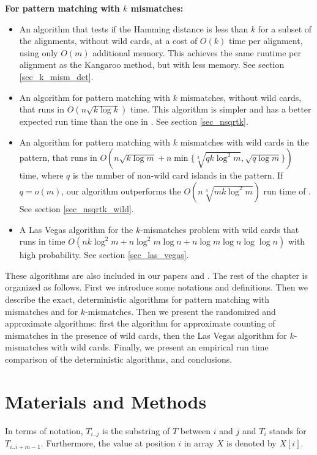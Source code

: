 {\bf For pattern matching with $k$ mismatches:}
\begin{itemize}
\item An algorithm that tests if the Hamming distance is less than $k$
for a subset of the alignments, without wild cards, at a cost of $O(k)$ time per
alignment, using only $O(m)$ additional memory. This achieves the same
runtime per alignment as the Kangaroo method, but with less memory. See section
\ref{sec_k_mism_det}.

\item An algorithm for pattern matching
with $k$ mismatches, without wild cards, that runs in $O(n\sqrt{k \log k})$
time. This algorithm is simpler and has a better expected run time than the one
in \cite{ALP04}. See section \ref{sec_nsqrtk}.

\item An algorithm for pattern matching
with $k$ mismatches with wild cards in the pattern, that runs
in $O(n\sqrt{k\log m}+n\min\{\sqrt[3]{qk\log^2 m},\sqrt{q\log m}\})$ time,
where $q$ is the number of non-wild card islands in the pattern.  If $q=o(m)$,
our algorithm outperforms the $O(n\sqrt[3]{mk\log^2m})$ run time of \cite{CP07}.
See section \ref{sec_nsqrtk_wild}.


\item A Las Vegas algorithm for the
$k$-mismatches problem with wild cards that runs in
time $O(nk\log^2 m+n\log^2m\log n+n\log m\log n\log\log n)$ with high
probability. See section \ref{sec_las_vegas}.
\end{itemize}

These algorithms are also included in our papers \cite{NRKM15} and
\cite{NRKM16}.
The rest of the chapter is organized as follows. First we introduce some notations
and definitions. 
Then we describe the exact, deterministic algorithms for pattern matching with
mismatches and for $k$-mismatches. Then we present the randomized and
approximate algorithms: first the algorithm for approximate counting of
mismatches in the presence of wild cards, then the Las Vegas algorithm for
$k$-mismatches with wild cards. Finally, we present an empirical run time
comparison of the deterministic algorithms, and conclusions.

\section{Materials and Methods}

In terms of notation, $T_{i..j}$ is the substring of $T$ between $i$ and $j$
and $T_i$ stands for $T_{i..i+m-1}$. Furthermore, the value at
position $i$ in array $X$ is denoted by $X[i]$. 

